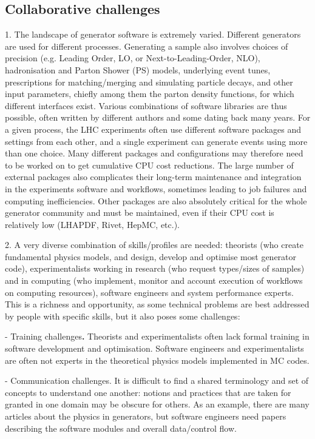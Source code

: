 \documentclass[11pt,a4paper]{article}
\begin{document}
\hypertarget{collaboration-challenges}{%
\subsection{Collaborative challenges}\label{collaboration-challenges}}

1. {The landscape of generator software is extremely varied}. Different
generators are used for different processes. Generating a sample also
involves choices of precision (e.g. Leading Order, LO, or
Next-to-Leading-Order, NLO), hadronisation and Parton Shower (PS)
models, underlying event tunes, prescriptions for matching/merging and
simulating particle decays, and other input parameters, chiefly among
them the parton density functions, for which different interfaces exist.
Various combinations of software libraries are thus possible, often
written by different authors and some dating back many years. For a
given process, the LHC experiments often use different software packages
and settings from each other, and a single experiment can generate
events using more than one choice. Many different packages and
configurations may therefore need to be worked on to get cumulative CPU
cost reductions. The large number of external packages also complicates
their long-term maintenance and integration in the experiments software
and workflows, sometimes leading to job failures and computing
inefficiencies. Other packages are also absolutely critical for the
whole generator community and must be maintained, even if their CPU cost
is relatively low (LHAPDF, Rivet, HepMC, etc.).

2. {A very diverse combination of skills/profiles are needed}: theorists
(who create fundamental physics models, and design, develop and optimise
most generator code), experimentalists working in research (who request
types/sizes of samples) and in computing (who implement, monitor and
account execution of workflows on computing resources), software
engineers and system performance experts. This is a richness and
opportunity, as some technical problems are best addressed by people
with specific skills, but it also poses some challenges:

- {Training challenges}\textbf{.} Theorists and experimentalists often
lack formal training in software development and optimisation. Software
engineers and experimentalists are often not experts in the theoretical
physics models implemented in MC codes.

- {Communication challenges}. It is difficult to find a shared
terminology and set of concepts to understand one another: notions and
practices that are taken for granted in one domain may be obscure for
others. As an example, there are many articles about the physics in
generators, but software engineers need papers describing the software
modules and overall data/control flow.
\end{document}
